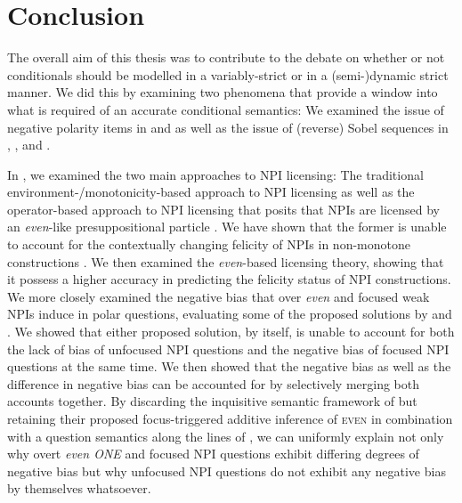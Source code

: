 \chapter{Conclusion}
The overall aim of this thesis was to contribute to the debate on whether or not conditionals should be modelled in a variably-strict or in a (semi-)dynamic strict manner. We did this by examining two phenomena that provide a window into what is required of an accurate conditional semantics: We examined the issue of negative polarity items in  and  as well as the issue of (reverse) Sobel sequences in , , and .

In , we examined the two main approaches to NPI licensing: The traditional environment-/monotonicity-based approach to NPI licensing \parencite{Fauconnier1975a,Fauconnier1975b,Ladusaw1980,Giannakidou1998,Fintel1999} as well as the operator-based approach to NPI licensing that posits that NPIs are licensed by an \textit{even}-like presuppositional particle \parencite{Lee1994,Lahiri1998,Crnic2011,Crnic2014-dogma,Crnic2014-nm,Jeong2021}. We have shown that the former is unable to account for the contextually changing felicity of NPIs in non-monotone constructions \parencite{Crnic2014-nm}. We then examined the \textit{even}-based licensing theory, showing that it possess a higher accuracy in predicting the felicity status of NPI constructions. We more closely examined the negative bias that over \textit{even} and focused weak NPIs induce in polar questions, evaluating some of the proposed solutions by \textcite{Crnic2014-dogma,Crnic2014-nm} and \textcite{Jeong2020,Jeong2021}. We showed that either proposed solution, by itself, is unable to account for both the lack of bias of unfocused NPI questions and the negative bias of focused NPI questions at the same time. We then showed that the negative bias as well as the difference in negative bias can be accounted for by selectively merging both accounts together. By discarding the inquisitive semantic framework of \textcite{Jeong2020,Jeong2021} but retaining their proposed focus-triggered additive inference of {\scshape even} in combination with a question semantics along the lines of \textcite{Guerzoni2014-enviro}, we can uniformly explain not only why overt \textit{even ONE} and focused NPI questions exhibit differing degrees of negative bias but why unfocused NPI questions do not exhibit any negative bias by themselves whatsoever.

